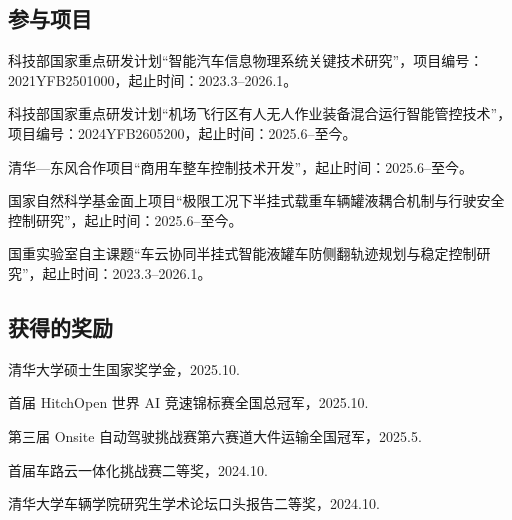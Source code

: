 \begin{resume}
  \subsection*{参与项目}

  \begin{achievements}
    \item 科技部国家重点研发计划“智能汽车信息物理系统关键技术研究”，项目编号：2021YFB2501000，起止时间：2023.3--2026.1。
    \item 科技部国家重点研发计划“机场飞行区有人无人作业装备混合运行智能管控技术”，项目编号：2024YFB2605200，起止时间：2025.6--至今。
    \item 清华—东风合作项目“商用车整车控制技术开发”，起止时间：2025.6--至今。
    \item 国家自然科学基金面上项目“极限工况下半挂式载重车辆罐液耦合机制与行驶安全控制研究”，起止时间：2025.6--至今。
    \item 国重实验室自主课题“车云协同半挂式智能液罐车防侧翻轨迹规划与稳定控制研究”，起止时间：2023.3--2026.1。
  \end{achievements}


  \subsection*{获得的奖励}

  \begin{achievements}
    \item 清华大学硕士生国家奖学金，2025.10.
    \item 首届 HitchOpen 世界 AI 竞速锦标赛全国总冠军，2025.10.
    \item 第三届 Onsite 自动驾驶挑战赛第六赛道大件运输全国冠军，2025.5.
    \item 首届车路云一体化挑战赛二等奖，2024.10.
    \item 清华大学车辆学院研究生学术论坛口头报告二等奖，2024.10.
  \end{achievements}

\end{resume}